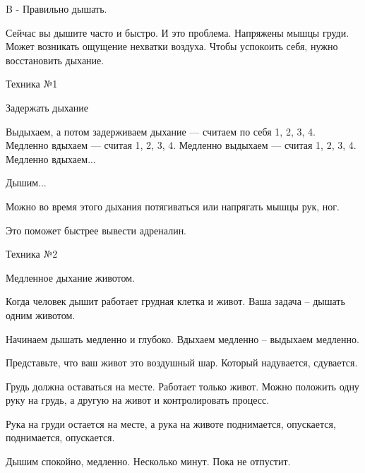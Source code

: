 B - Правильно дышать. 

Сейчас вы дышите часто и быстро. И это проблема. Напряжены мышцы груди. Может
возникать ощущение нехватки воздуха. Чтобы успокоить себя, нужно восстановить
дыхание. 

Техника №1

Задержать дыхание

Выдыхаем, а потом задерживаем дыхание — считаем по себя 1, 2, 3, 4. Медленно
вдыхаем — считая 1, 2, 3, 4. Медленно выдыхаем — считая 1, 2, 3, 4. Медленно
вдыхаем... 

Дышим...

Можно во время этого дыхания потягиваться или напрягать мышцы рук, ног. 

Это поможет быстрее вывести адреналин. 

Техника №2

Медленное дыхание животом. 

Когда человек дышит работает грудная клетка и живот. Ваша задача – дышать одним
животом. 

Начинаем дышать медленно и глубоко. Вдыхаем медленно – выдыхаем медленно. 

Представьте, что ваш живот это воздушный шар. Который надувается, сдувается. 

Грудь должна оставаться на месте. Работает только живот. Можно положить одну
руку на грудь, а другую на живот и контролировать процесс. 

Рука на груди остается на месте, а рука на животе поднимается, опускается,
поднимается, опускается. 

Дышим спокойно, медленно.  Несколько минут. Пока не отпустит.
